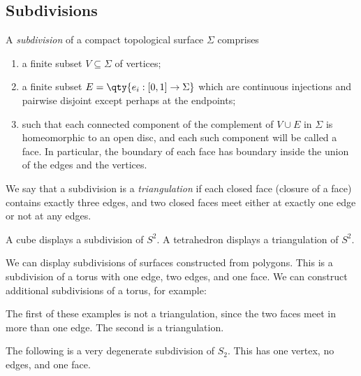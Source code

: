 \subsection{Subdivisions}
\begin{definition}
	A \textit{subdivision} of a compact topological surface $\Sigma$ comprises
	\begin{enumerate}
		\item a finite subset $V \subseteq \Sigma$ of vertices;
		\item a finite subset $E = \qty{e_i : [0,1] \to \Sigma}$ which are continuous injections and pairwise disjoint except perhaps at the endpoints;
		\item such that each connected component of the complement of $V \cup E$ in $\Sigma$ is homeomorphic to an open disc, and each such component will be called a face.
		      In particular, the boundary of each face has boundary inside the union of the edges and the vertices.
	\end{enumerate}
	We say that a subdivision is a \textit{triangulation} if each closed face (closure of a face) contains exactly three edges, and two closed faces meet either at exactly one edge or not at any edges.
\end{definition}
\begin{example}
	A cube displays a subdivision of $S^2$.
	A tetrahedron displays a triangulation of $S^2$.
\end{example}
\begin{example}
	We can display subdivisions of surfaces constructed from polygons.
	This is a subdivision of a torus with one edge, two edges, and one face.
	We can construct additional subdivisions of a torus, for example:
	\begin{center}
		 \quad {}
	\end{center}
	The first of these examples is not a triangulation, since the two faces meet in more than one edge.
	The second is a triangulation.
\end{example}
\begin{remark}
	The following is a very degenerate subdivision of $S_2$.
	This has one vertex, no edges, and one face.
\end{remark}

